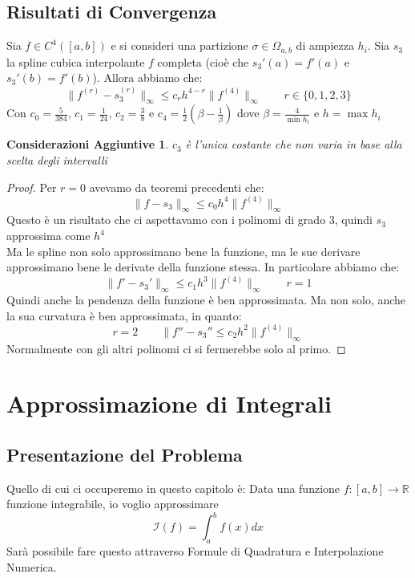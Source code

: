 \documentclass[11pt,a4paper,twoside]{article}
\newtheorem*{cons}{Considerazioni Aggiuntive}
\theoremstyle{definition}
\begin{document}
\subsection{Risultati di Convergenza}

\begin{thm}{}{}
	Sia $f \in C^4([a,b])$ e si consideri una partizione $\sigma \in \Omega_{a,b}$ di ampiezza $h_i$. Sia $s_3$ la spline cubica interpolante $f$ completa (cioè che $s_3'(a) = f'(a)$ e $s_3'(b) = f'(b)$). Allora abbiamo che:
	\[ \|f^{(r)} - s_3^{(r)}\|_\infty \leq c_r h^{4-r}\|f^{(4)}\|_\infty \qquad r \in \{0,1,2,3\} \]
	Con $c_0 = \frac 5{384}$, $c_1 = \frac 1{24}$, $c_2 = \frac 38$ e $c_4 = \frac 12(\beta - \frac 1 \beta)$ dove $\beta =\frac 4{\min h_i}$ e $h = \max h_i$
\end{thm}

\begin{cons}
	$c_3$ è l'unica costante che non varia in base alla scelta degli intervalli
\end{cons}

\begin{proof}
	Per $r = 0$ avevamo da teoremi precedenti che:
	\[ \|f-s_3\|_\infty \leq c_0 h^4 \|f^{(4)}\|_\infty \]
	Questo è un risultato che ci aspettavamo con i polinomi di grado $3$, quindi $s_3$ approssima come $h^4$\\
	Ma le spline non solo approssimano bene la funzione, ma le sue derivare approssimano bene le derivate della funzione stessa. In particolare abbiamo che:
	\[ \|f' - s_3'\|_\infty \leq c_1 h^3 \|f^{(4)}\|_\infty \qquad r = 1 \]
	Quindi anche la pendenza della funzione è ben approssimata. Ma non solo, anche la sua curvatura è ben approssimata, in quanto:
	\[r = 2\qquad \|f'' - s_3'' \leq c_2 h^2 \|f^{(4)}\|_\infty\]
	Normalmente con gli altri polinomi ci si fermerebbe solo al primo.
\end{proof}

\newpage

\section{Approssimazione di Integrali}

\subsection{Presentazione del Problema}

Quello di cui ci occuperemo in questo capitolo è: Data una funzione $f:[a,b] \to \mathbb R$ funzione integrabile, io voglio approssimare \[\mathcal I(f) = \int_a^bf(x)dx\]
Sarà possibile fare questo attraverso Formule di Quadratura e Interpolazione Numerica.
\end{document}
